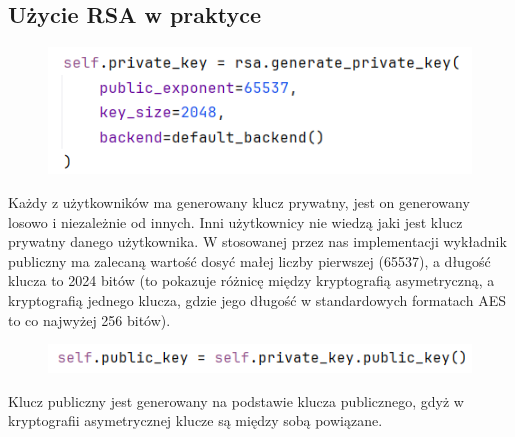 \subsection{Użycie RSA w praktyce}
\label{sec:RSAPraktyka}
\begin{figure}[H]
    \centering
    \includegraphics[width=\textwidth]{Images/CodeX11.png}
\end{figure}
Każdy z użytkowników ma generowany klucz prywatny, jest on generowany losowo i niezależnie od innych. Inni użytkownicy nie wiedzą jaki jest klucz prywatny danego użytkownika. W stosowanej przez nas implementacji wykładnik publiczny ma zalecaną wartość dosyć małej liczby pierwszej (65537), a długość klucza to 2024 bitów (to pokazuje różnicę między kryptografią asymetryczną, a kryptografią jednego klucza, gdzie jego długość w standardowych formatach AES to co najwyżej 256 bitów).
\begin{figure}[H]
    \centering
    \includegraphics[width=\textwidth]{Images/CodeX12.png}
\end{figure}
Klucz publiczny jest generowany na podstawie klucza publicznego, gdyż w kryptografii asymetrycznej klucze są między sobą powiązane.
